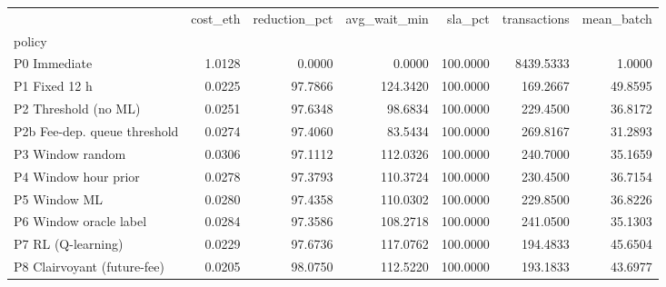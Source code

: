 \begin{tabular}{lrrrrrr}
\toprule
 & cost_eth & reduction_pct & avg_wait_min & sla_pct & transactions & mean_batch \\
policy &  &  &  &  &  &  \\
\midrule
P0 Immediate & 1.0128 & 0.0000 & 0.0000 & 100.0000 & 8439.5333 & 1.0000 \\
P1 Fixed 12 h & 0.0225 & 97.7866 & 124.3420 & 100.0000 & 169.2667 & 49.8595 \\
P2 Threshold (no ML) & 0.0251 & 97.6348 & 98.6834 & 100.0000 & 229.4500 & 36.8172 \\
P2b Fee-dep. queue threshold & 0.0274 & 97.4060 & 83.5434 & 100.0000 & 269.8167 & 31.2893 \\
P3 Window random & 0.0306 & 97.1112 & 112.0326 & 100.0000 & 240.7000 & 35.1659 \\
P4 Window hour prior & 0.0278 & 97.3793 & 110.3724 & 100.0000 & 230.4500 & 36.7154 \\
P5 Window ML & 0.0280 & 97.4358 & 110.0302 & 100.0000 & 229.8500 & 36.8226 \\
P6 Window oracle label & 0.0284 & 97.3586 & 108.2718 & 100.0000 & 241.0500 & 35.1303 \\
P7 RL (Q-learning) & 0.0229 & 97.6736 & 117.0762 & 100.0000 & 194.4833 & 45.6504 \\
P8 Clairvoyant (future-fee) & 0.0205 & 98.0750 & 112.5220 & 100.0000 & 193.1833 & 43.6977 \\
\bottomrule
\end{tabular}
